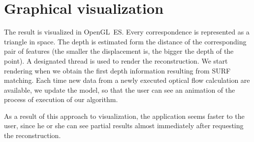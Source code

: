 \section{Graphical visualization}

The result is visualized in OpenGL~ES.
Every correspondence is represented as a triangle in space.
The depth is estimated form the distance of the corresponding pair of features (the smaller the displacement is, the bigger the depth of the point). 
A designated thread is used to render the reconstruction. 
We start rendering when we obtain the first depth information resulting from SURF matching.
Each time new data from a newly executed optical flow calculation are available, we update the model, so that the user can see an animation of the process of execution of our algorithm.

As a result of this approach to visualization, the application seems faster to the user, since he or she can see partial results almost immediately after requesting the reconstruction. 

